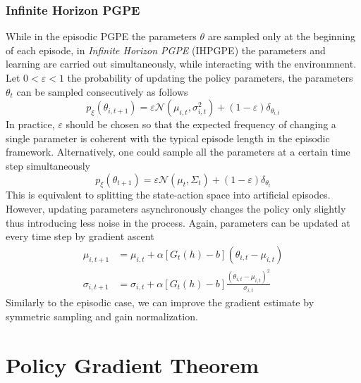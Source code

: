 \subsubsection{Infinite Horizon PGPE}
While in the episodic PGPE the parameters $\theta$ are sampled only at the beginning of each episode, in \emph{Infinite Horizon PGPE} (IHPGPE) \cite{sehnke2012parameter} the parameters and learning are carried out simultaneously, while interacting with the environmnent. Let $0 < \varepsilon < 1$ the probability of updating the policy parameters, the parameters $\theta_t$ can be sampled consecutively as follows
\begin{equation}
	p_\xi(\theta_{i,t+1}) = \varepsilon \mathcal{N}(\mu_{i,t}, \sigma_{i,t}^2) 
							+ (1-\varepsilon) \delta_{\theta_{i,t}}
\end{equation}
In practice, $\varepsilon$ should be chosen so that the expected frequency of
changing a single parameter is coherent with the typical episode length in the
episodic framework. Alternatively, one could sample all the parameters at a
certain time step simultaneously
\begin{equation}
	p_\xi(\theta_{t+1}) = \varepsilon \mathcal{N}(\mu_{t}, \Sigma_t) 
							+ (1-\varepsilon) \delta_{\theta_{t}}
\end{equation}
This is equivalent to splitting the state-action space into artificial
episodes. However, updating parameters asynchronously changes the policy only
slightly thus introducing less noise in the process. Again, parameters can be
updated at every time step by gradient ascent
\begin{equation}
	\begin{split}
		\mu_{i,t+1} &= \mu_{i,t} + \alpha \left[G_t(h) - b\right] (\theta_{i,t}
		- \mu_{i,t})\\
		\sigma_{i,t+1} &= \sigma_{i,t} + \alpha \left[G_t(h) - b\right] 
		\frac{(\theta_{i,t} -\mu_{i,t})^2}{\sigma_{i,t}}
	\end{split}
\end{equation}
Similarly to the episodic case, we can improve the gradient estimate by
symmetric sampling and gain normalization. 


\section{Policy Gradient Theorem}

